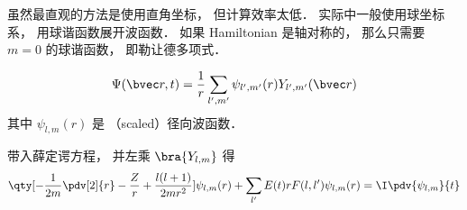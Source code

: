 

虽然最直观的方法是使用直角坐标， 但计算效率太低． 实际中一般使用球坐标系， 用球谐函数展开波函数． 如果 Hamiltonian 是轴对称的， 那么只需要 $m = 0$ 的球谐函数， 即勒让德多项式．

\begin{equation}
\Psi(\bvec r, t) = \frac{1}{r}\sum_{l',m'} \psi_{l',m'}(r) Y_{l',m'}(\bvec r)
\end{equation}
其中 $\psi_{l,m}(r)$ 是 （scaled）径向波函数．

带入薛定谔方程， 并左乘 $\bra{Y_{l,m}}$ 得
\begin{equation}
\qty[ -\frac{1}{2m} \pdv[2]{r} -\frac{Z}{r} + \frac{l(l+1)}{2mr^2}]\psi_{l,m}(r) + \sum_{l'} E(t)rF(l, l')\psi_{l,m}(r) = \I \pdv{\psi_{l,m}}{t}
\end{equation}
